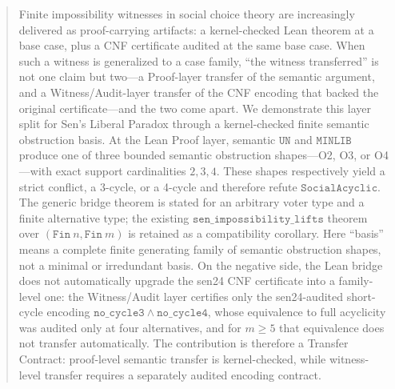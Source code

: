 \begin{abstract}
Finite impossibility witnesses in social choice theory are increasingly delivered as proof-carrying artifacts: a kernel-checked Lean theorem at a base case, plus a CNF certificate audited at the same base case.
When such a witness is generalized to a case family, ``the witness transferred'' is not one claim but two---a Proof-layer transfer of the semantic argument, and a Witness/Audit-layer transfer of the CNF encoding that backed the original certificate---and the two come apart.
We demonstrate this layer split for Sen's Liberal Paradox through a kernel-checked finite semantic obstruction basis.
At the Lean Proof layer, semantic \(\mathtt{UN}\) and \(\mathtt{MINLIB}\) produce one of three bounded semantic obstruction shapes---O2, O3, or O4---with exact support cardinalities \(2,3,4\).
These shapes respectively yield a strict conflict, a 3-cycle, or a 4-cycle and therefore refute \(\mathtt{SocialAcyclic}\).
The generic bridge theorem is stated for an arbitrary voter type and a finite alternative type; the existing \(\mathtt{sen\_impossibility\_lifts}\) theorem over \((\mathtt{Fin}\ n,\mathtt{Fin}\ m)\) is retained as a compatibility corollary.
Here ``basis'' means a complete finite generating family of semantic obstruction shapes, not a minimal or irredundant basis.
On the negative side, the Lean bridge does not automatically upgrade the sen24 CNF certificate into a family-level one: the Witness/Audit layer certifies only the sen24-audited short-cycle encoding \(\mathtt{no\_cycle3 \wedge no\_cycle4}\), whose equivalence to full acyclicity was audited only at four alternatives, and for \(m \geq 5\) that equivalence does not transfer automatically.
The contribution is therefore a Transfer Contract: proof-level semantic transfer is kernel-checked, while witness-level transfer requires a separately audited encoding contract.
\end{abstract}
